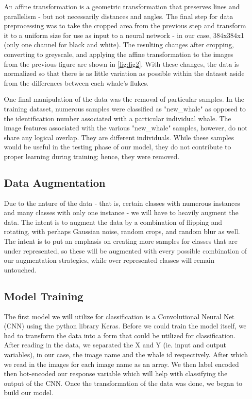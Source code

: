 \documentclass[paper=a4, fontsize=11pt]{scrartcl}
\numberwithin{equation}{section}		%
\numberwithin{table}{section}				%
\begin{document}
An affine transformation is a geometric transformation that preserves lines and parallelism - but not necessarily distances and angles. The final step for data preprocessing was to take the cropped area from the previous step and transform it to a uniform size for use as input to a neural network - in our case, 384x384x1 (only one channel for black and white). The resulting changes after cropping, converting to greyscale, and applying the affine transformation to the images from the previous figure are shown in \autoref{fig:fig2}. With these changes, the data is normalized so that there is as little variation as possible within the dataset aside from the differences between each whale's flukes.

One final manipulation of the data was the removal of particular samples. In the training dataset, numerous samples were classified as "new\_whale" as opposed to the identification number associated with a particular individual whale. The image features associated with the various "new\_whale" samples, however, do not share any logical overlap. They are different individuals. While these samples would be useful in the testing phase of our model, they do not contribute to proper learning during training; hence, they were removed.

\subsection{Data Augmentation}\label{subsec:Augmentation}
Due to the nature of the data - that is, certain classes with numerous instances and many classes with only one instance - we will have to heavily augment the data. The intent is to augment the data by a combination of flipping and rotating, with perhaps Gaussian noise, random crops, and random blur as well. The intent is to put an emphasis on creating more samples for classes that are under represented, so these will be augmented with every possible combination of our augmentation strategies, while over represented classes will remain untouched. 

\subsection{Model Training}

The first model we will utilize for classification is a Convolutional Neural Net (CNN) using the python library Keras. Before we could train the model itself, we had to transform the data into a form that could be utilized for classification. After reading in the data, we separated the X and Y (ie. input and output variables), in our case, the image name and the whale id respectively. After which we read in the images for each image name as an array. We then label encoded then hot-encoded our response variable which will help with classifying the output of the CNN. Once the transformation of the data was done, we began to build our model.
\end{document}
